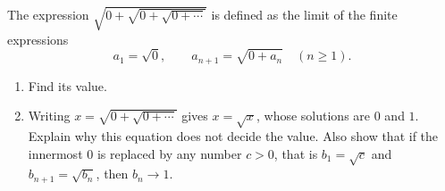 The expression $\sqrt{0+\sqrt{0+\sqrt{0+\cdots}}}$ is defined as the limit of the finite expressions
\[
a_1=\sqrt0,\qquad a_{n+1}=\sqrt{0+a_n}\quad(n\ge1).
\]
\begin{enumerate}
\item[(a)] Find its value.
\item[(b)] Writing $x=\sqrt{0+\sqrt{0+\cdots}}$ gives $x=\sqrt{x}$, whose solutions are $0$ and $1$. Explain why this equation does not decide the value. Also show that if the innermost $0$ is replaced by any number $c>0$, that is $b_1=\sqrt c$ and $b_{n+1}=\sqrt{b_n}$, then $b_n\to1$.
\end{enumerate}
